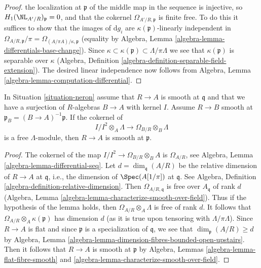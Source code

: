 \begin{proof}
the localization at $\mathfrak p$ of the middle map in the sequence is
injective, so $H_1(\NL_{A'/R})_\mathfrak p = 0$, and
that the cokernel $\Omega_{A'/R, \mathfrak p}$ is finite free.
To do this it suffices to show
that the images of $\text{d}g_i$ are $\kappa(\mathfrak p)$-linearly
independent in
$\Omega_{A/R, \mathfrak p}/\pi = \Omega_{(A/\pi A)/\kappa, \mathfrak p}$
(equality by Algebra, Lemma \ref{algebra-lemma-differentials-base-change}).
Since $\kappa \subset \kappa(\mathfrak p) \subset \Lambda/\pi \Lambda$
we see that $\kappa(\mathfrak p)$ is separable over $\kappa$
(Algebra, Definition \ref{algebra-definition-separable-field-extension}).
The desired linear independence now follows from
Algebra, Lemma \ref{algebra-lemma-computation-differential}.
\end{proof}

\begin{lemma}
\label{lemma-neron-when-smooth}
In Situation \ref{situation-neron} assume that $R \to A$ is smooth
at $\mathfrak q$ and that we have a surjection of $R$-algebras
$B \to A$ with kernel $I$. Assume $R \to B$ smooth at
$\mathfrak p_B = (B \to A)^{-1}\mathfrak p$. If the cokernel of
$$
I/I^2 \otimes_A \Lambda \to \Omega_{B/R} \otimes_B \Lambda
$$
is a free $\Lambda$-module, then $R \to A$ is smooth at $\mathfrak p$.
\end{lemma}

\begin{proof}
The cokernel of the map $I/I^2 \to \Omega_{B/R} \otimes_B A$
is $\Omega_{A/R}$, see Algebra, Lemma \ref{algebra-lemma-differential-seq}.
Let $d = \dim_\mathfrak q(A/R)$ be the relative dimension of $R \to A$
at $\mathfrak q$, i.e., the dimension of $\Spec(A[1/\pi])$ at $\mathfrak q$.
See Algebra, Definition \ref{algebra-definition-relative-dimension}.
Then $\Omega_{A/R, \mathfrak q}$ is free over $A_\mathfrak q$ of rank $d$
(Algebra, Lemma \ref{algebra-lemma-characterize-smooth-over-field}).
Thus if the hypothesis of the lemma holds,
then $\Omega_{A/R} \otimes_A \Lambda$ is free of rank $d$.
It follows that $\Omega_{A/R} \otimes_A \kappa(\mathfrak p)$
has dimension $d$ (as it is true upon tensoring with $\Lambda/\pi \Lambda$).
Since $R \to A$ is flat and since $\mathfrak p$
is a specialization of $\mathfrak q$, we see that
$\dim_\mathfrak p(A/R) \geq d$ by Algebra, Lemma
\ref{algebra-lemma-dimension-fibres-bounded-open-upstairs}.
Then it follows that $R \to A$ is smooth at $\mathfrak p$ by
Algebra, Lemmas \ref{algebra-lemma-flat-fibre-smooth} and
\ref{algebra-lemma-characterize-smooth-over-field}.
\end{proof}

